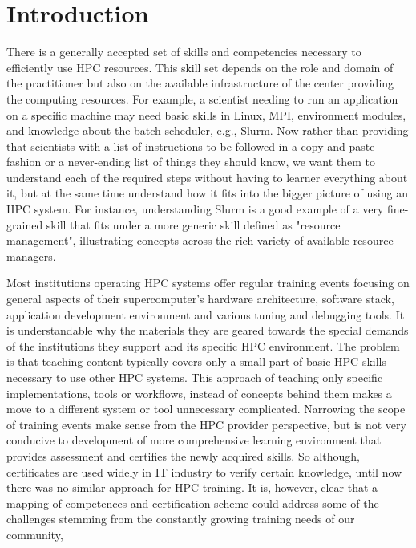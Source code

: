 \documentclass[jocse]{jocseart}
\begin{document}
%
%
\begin{CCSXML}
\end{CCSXML}



\keywords{}

\maketitle

\section{Introduction}

There is a generally accepted set of skills and competencies necessary to efficiently use HPC resources.
This skill set depends on the role and domain of the practitioner but also on the available infrastructure of the center providing the computing resources.
For example, a scientist needing to run an application on a specific machine may need basic skills in Linux, MPI, environment modules, and knowledge about the batch scheduler, e.g., Slurm.
Now rather than providing that scientists with a list of instructions to be followed in a copy and paste fashion or a never-ending list of things they should know, we want them to understand each of the required steps without having to learner everything about it, but at the same time understand how it fits into the bigger picture of using an HPC system.
For instance, understanding Slurm is a good example of a very fine-grained skill that fits under a more generic skill defined as "resource management", illustrating concepts across the rich variety of available resource managers.

Most institutions operating HPC systems offer regular training events focusing on general aspects of their supercomputer's hardware architecture, software stack, application development environment  and various tuning and debugging tools.
It is understandable why the materials they are geared towards the special demands of the institutions they support and its specific HPC environment.
The problem is that teaching content typically covers only a small part of basic HPC skills necessary to use other HPC systems.
This approach of teaching only specific implementations, tools or workflows, instead of concepts behind them makes a move to a different system or tool unnecessary complicated.
Narrowing the scope of training events make sense from the HPC provider perspective, but is not very conducive to development of more comprehensive learning environment that provides assessment and certifies the newly acquired skills. So although, certificates are used widely in IT industry to verify certain knowledge, until now there was no similar approach for HPC training.
It is, however, clear that a mapping of competences and certification scheme could address some of the challenges stemming from the constantly growing training needs of our community,
\end{document}
